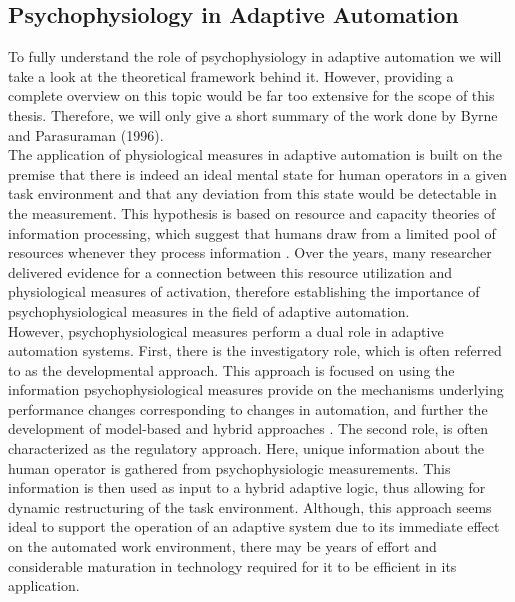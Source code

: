 \subsection{Psychophysiology in Adaptive Automation}
To fully understand the role of psychophysiology in adaptive automation we will take a look at the theoretical framework behind it. However, providing a complete overview on this topic would be far too extensive for the scope of this thesis. Therefore, we will only give a short summary of the work done by Byrne and Parasuraman (1996).\\
The application of physiological measures in adaptive automation is built on the premise that there is indeed an ideal mental state for human operators in a given task environment and that any deviation from this state would be detectable in the measurement. 
This hypothesis is based on resource and capacity theories of information processing, which suggest that humans draw from a limited pool of resources whenever they process information \cite{Byrne1996}. Over the years, many researcher delivered evidence for a connection between this resource utilization and physiological measures of activation, therefore establishing the importance of psychophysiological measures in the field of adaptive automation.\\
However, psychophysiological measures perform a dual role in adaptive automation systems. First, there is the investigatory role, which is often referred to as the developmental approach. This approach is focused on using the information psychophysiological measures provide on the mechanisms underlying performance changes corresponding to changes in automation, and further the development of model-based and hybrid approaches \cite{Byrne1996}. The second role, is often characterized as the regulatory approach. Here, unique information about the human operator is gathered from psychophysiologic measurements. This information is then used as input to a hybrid adaptive logic, thus allowing for dynamic restructuring of the task environment. Although, this approach seems ideal to support the operation of an adaptive system due to its immediate effect on the automated work environment, there may be years of effort and considerable maturation in technology required for it to be efficient in its application.  


